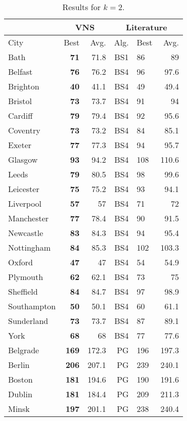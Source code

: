 \documentclass[dvipsnames,format=sigconf,anonymous=true,review=true]{acmart}
\begin{document}
\begin{table}
	\caption{Results for $k=2$.}
	\label{tab:k2}  
	\begin{tabular}{l|rr|rlr}
		\hline
		\multicolumn{1}{c}{ } & \multicolumn{2}{|c}{VNS} & \multicolumn{3}{|c}{Literature} \\
		\hline
		City & Best & Avg. & Alg. & Best & Avg. \\ \hline
		Bath&\bf{71}&71.8&BS1&86&89\\
		Belfast&\bf{76}&76.2&BS4&96&97.6\\
		Brighton&\bf{40}&41.1&BS4&49&49.4\\
		Bristol&\bf{73}&73.7&BS4&91&94\\
		Cardiff&\bf{79}&79.4&BS4&92&95.6\\
		Coventry&\bf{73}&73.2&BS4&84&85.1\\
		Exeter&\bf{77}&77.3&BS4&94&95.7\\
		Glasgow&\bf{93}&94.2&BS4&108&110.6\\
		Leeds&\bf{79}&80.5&BS4&98&99.6\\
		Leicester&\bf{75}&75.2&BS4&93&94.1\\
		Liverpool&\bf{57}&57&BS4&71&72\\
		Manchester&\bf{77}&78.4&BS4&90&91.5\\
		Newcastle&\bf{83}&84.3&BS4&94&95.4\\
		Nottingham&\bf{84}&85.3&BS4&102&103.3\\
		Oxford&\bf{47}&47&BS4&54&54.9\\
		Plymouth&\bf{62}&62.1&BS4&73&75\\
		Sheffield&\bf{84}&84.7&BS4&97&98.9\\
		Southampton&\bf{50}&50.1&BS4&60&61.1\\
		Sunderland&\bf{73}&73.7&BS4&87&89.1\\
		York&\bf{68}&68&BS4&77&77.6\\ \hline \hline
		Belgrade&\bf{169}&172.3&PG&196&197.3\\
		Berlin&\bf{206}&207.1&PG&239&240.1\\
		Boston&\bf{181}&194.6&PG&190&191.6\\
		Dublin&\bf{181}&184.4&PG&209&211.3\\
		Minsk&\bf{197}&201.1&PG&238&240.4\\
		\hline

	\end{tabular}
\end{table}
\end{document}
